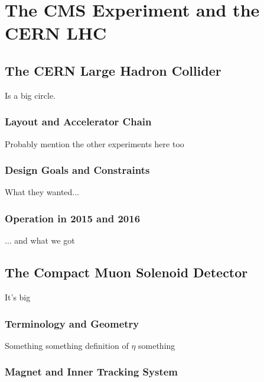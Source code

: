 \chapter{The CMS Experiment and the CERN LHC}


\section{The CERN Large Hadron Collider}
Is a big circle.

\subsection{Layout and Accelerator Chain}
Probably mention the other experiments here too


\subsection{Design Goals and Constraints}
What they wanted...


\subsection{Operation in 2015 and 2016}
... and what we got




\section{The Compact Muon Solenoid Detector}
It's big~\cite{Chatrchyan:2008zzk}

\subsection{Terminology and Geometry}
Something something definition of $\eta$ something


\subsection{Magnet and Inner Tracking System}

